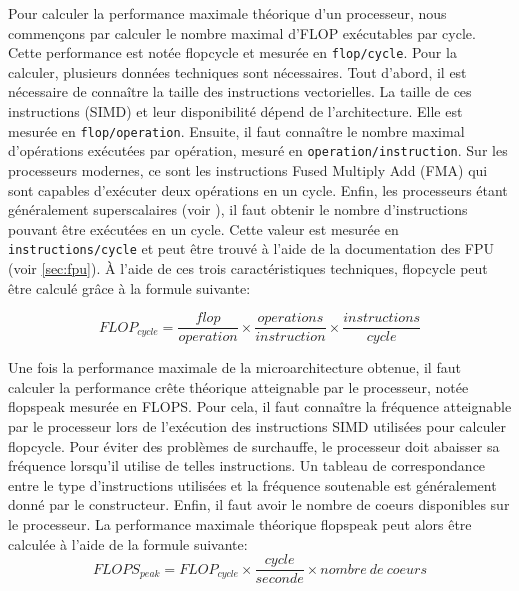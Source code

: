         Pour calculer la performance maximale théorique d'un processeur, nous commençons par calculer le nombre maximal d'\gls{FLOP} exécutables par cycle. Cette performance est notée \gls{flopcycle} et mesurée en \verb=flop/cycle=. Pour la calculer, plusieurs données techniques sont nécessaires. 
        Tout d'abord, il est nécessaire de connaître la taille des instructions vectorielles. La taille de ces instructions (SIMD) et leur disponibilité dépend de l'architecture. Elle est mesurée en \verb=flop/operation=.
        Ensuite, il faut connaître le nombre maximal d'opérations exécutées par opération, mesuré en \verb=operation/instruction=. Sur les processeurs modernes, ce sont les instructions Fused Multiply Add (\gls{FMA}) qui sont capables d'exécuter deux opérations en un cycle.
        Enfin, les processeurs étant généralement superscalaires (voir ), il faut obtenir le nombre d'instructions pouvant être exécutées en un cycle. Cette valeur est mesurée en \verb=instructions/cycle= et peut être trouvé à l'aide de la documentation des \gls{FPU} (voir \autoref{sec:fpu}).
        À l'aide de ces trois caractéristiques techniques, \gls{flopcycle} peut être calculé grâce à la formule suivante:
        
        \begin{equation}
        \label{eq:floc}
            FLOP_{cycle} = \frac{flop}{operation} \times \frac{operations}{instruction} \times \frac{instructions}{cycle}
        \end{equation}
        
        Une fois la performance maximale de la microarchitecture obtenue, il faut calculer la performance crête théorique atteignable par le processeur, notée \gls{flopspeak} mesurée en \gls{FLOPS}. Pour cela, il faut connaître la fréquence atteignable par le processeur lors de l'exécution des instructions SIMD utilisées pour calculer \gls{flopcycle}. Pour éviter des problèmes de surchauffe, le processeur doit abaisser sa fréquence lorsqu'il utilise de telles instructions. Un tableau de correspondance entre le type d'instructions utilisées et la fréquence soutenable est généralement donné par le constructeur. Enfin, il faut avoir le nombre de coeurs disponibles sur le processeur. La performance maximale théorique \gls{flopspeak} peut alors être calculée à l'aide de la formule suivante:
        \begin{equation}
        \label{eq:flops}
            FLOPS_{peak} = FLOP_{cycle} \times \frac{cycle}{seconde} \times nombre\ de\ coeurs
        \end{equation}
    
